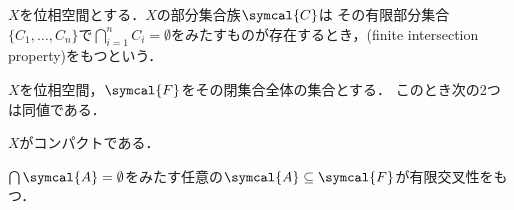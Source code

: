 \documentclass{ltjsbook}
\begin{document}
\(X\)を位相空間とする．\(X\)の部分集合族\(\symcal{C}\)は
その有限部分集合\(\{C_1, \ldots, C_n\}\)で\(\bigcap_{i = 1}^n C_i  = \emptyset\)をみたすものが存在するとき，(finite intersection property)をもつという．

\begin{thmbox}
\begin{proposition}
\(X\)を位相空間，\(\symcal{F}\)をその閉集合全体の集合とする．
このとき次の2つは同値である．
\begin{conditions}
    \item\label{fip-compact} \(X\)がコンパクトである．
    \item\label{fip-fip} \(\bigcap \symcal{A} = \emptyset\)をみたす任意の\(\symcal{A} \subseteq \symcal{F}\)が有限交叉性をもつ．
\end{conditions}
\end{proposition}
\end{thmbox}
\end{document}
